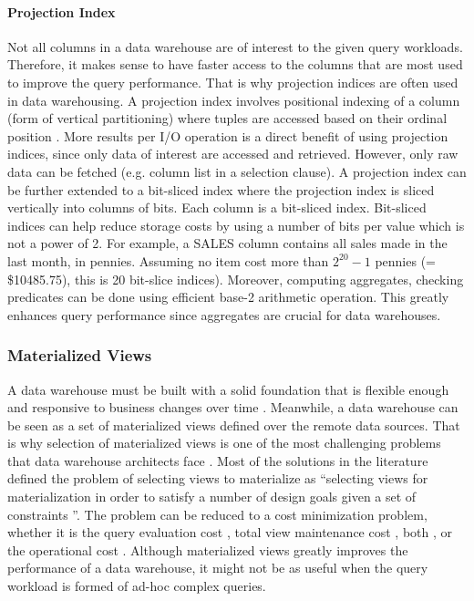 \documentclass[12pt,a4paper]{article}
\begin{document}
\paragraph{Projection Index}
Not all columns in a data warehouse are of interest to the given query workloads. Therefore, it makes sense to have faster access to the columns that are
most used to improve the query performance. That is why projection indices are often used in data warehousing. A projection index involves positional indexing
of a column (form of vertical partitioning) where tuples are accessed based on their ordinal position \cite{datta2002parallel}. More results per I/O operation
is a direct benefit of using projection indices, since only data of interest are accessed and retrieved. However, only raw data can be fetched (e.g. column
list in a selection clause). A projection index can be further extended to a bit-sliced index \cite{oneil1997improved} where the projection index is sliced
vertically into columns of bits. Each column is a bit-sliced index. Bit-sliced indices can help reduce storage costs by using a number of bits per value which
is not a power of 2. For example, a SALES column contains all sales made in the last month, in pennies. Assuming no item cost more than $2^{20} - 1$ pennies (=
\$10485.75), this is 20 bit-slice indices). Moreover, computing aggregates, checking predicates can be done using efficient base-2 arithmetic operation. This
greatly enhances query performance since aggregates are crucial for data warehouses.

\subsubsection{Materialized Views}
A data warehouse must be built with a solid foundation that is flexible enough and responsive to business changes over time \cite{armstrong1997data}.
Meanwhile, a data warehouse can be seen as a set of materialized views defined over the remote data sources. That is why
selection of materialized
views is one of the most challenging problems that data warehouse architects face \cite{theodoratos2000general}. Most of the solutions in the literature
defined the problem of selecting views to materialize as \textquotedblleft selecting views for materialization in order to satisfy a number of design goals
given a set of constraints \textquotedblright. The problem can be reduced to a cost minimization problem, whether it is the query evaluation cost
\cite{harinarayan1996implementing}, total view maintenance cost \cite{kenneth1996materialized}, both \cite{yang1997algorithms}, or the operational cost
\cite{elena1997materialized, gupta2005selection, theodoratos1999designing, theodoratos1997data, theodoratos1999designingdw, theodoratos2000incremental,
yang1997algorithms}. Although materialized views greatly improves the performance of a data warehouse, it might not be as useful when the query workload is
formed of ad-hoc complex queries.
\end{document}
